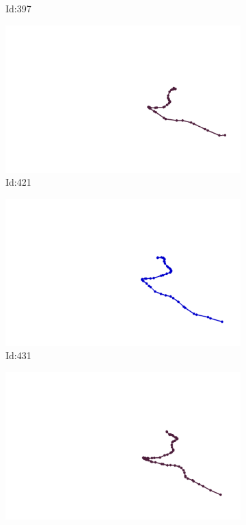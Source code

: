 \documentclass[12pt,twoside]{report}
\begin{document}
\begin{figure}
\begin{subfigure}[b]{0.20\textwidth}
\caption{Id:397}
\end{subfigure}
\begin{subfigure}[b]{0.20\textwidth}
\centering
\includegraphics[width=\textwidth]{../trajectories/421.png}
\caption{Id:421}
\end{subfigure}
\begin{subfigure}[b]{0.20\textwidth}
\centering
\includegraphics[width=\textwidth]{../trajectories/431.png}
\caption{Id:431}
\end{subfigure}
\begin{subfigure}[b]{0.20\textwidth}
\centering
\includegraphics[width=\textwidth]{../trajectories/435.png}

\end{subfigure}
\end{figure}
\end{document}
